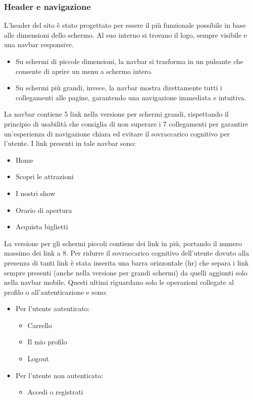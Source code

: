 \subsubsection{Header e navigazione}
L’header del sito è stato progettato per essere il più funzionale possibile in base alle dimensioni dello schermo. Al suo interno si trovano il logo, sempre visibile e una navbar responsive.
\begin{itemize}
    \item Su schermi di piccole dimensioni, la navbar si trasforma in un pulsante che consente di aprire un menu a schermo intero.
    \item Su schermi più grandi, invece, la navbar mostra direttamente tutti i collegamenti alle pagine, garantendo una navigazione immediata e intuitiva.
\end{itemize}
La navbar contiene 5 link nella versione per schermi grandi, rispettando il principio di usabilità che consiglia di non superare i 7 collegamenti per garantire un'esperienza di navigazione chiara ed evitare il sovraccarico cognitivo per l'utente. I link presenti in tale navbar sono:
\begin{itemize}
    \item Home
    \item Scopri le attrazioni
    \item I nostri show
    \item Orario di apertura
    \item Acquista biglietti
\end{itemize}
La versione per gli schermi piccoli contiene dei link in più, portando il numero massimo dei link a 8. Per ridurre il sovraccarico cognitivo dell'utente dovuto alla presenza di tanti link è stata inserita una barra orizzontale (hr) che separa i link sempre presenti (anche nella versione per grandi schermi) da quelli aggiunti solo nella navbar mobile. Questi ultimi riguardano solo le operazioni collegate al profilo o all'autenticazione e sono:
\begin{itemize}
    \item Per l'utente autenticato:
    \begin{itemize}
        \item Carrello
        \item Il mio profilo
        \item Logout
    \end{itemize}
    \item Per l'utente non autenticato:
    \begin{itemize}
        \item Accedi o registrati
    \end{itemize}
\end{itemize}
